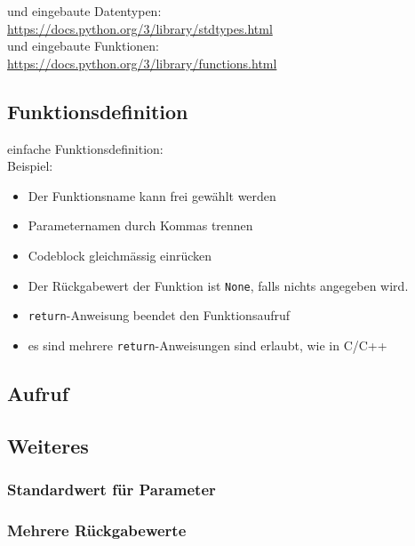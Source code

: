 und eingebaute Datentypen:\\
\url{https://docs.python.org/3/library/stdtypes.html}\\

und eingebaute Funktionen:\\
\url{https://docs.python.org/3/library/functions.html}

\subsection{Funktionsdefinition}
einfache Funktionsdefinition:\\


Beispiel:\\


\begin{itemize}
	\item Der Funktionsname kann frei gewählt werden
	\item Parameternamen durch Kommas trennen
	\item Codeblock gleichmässig einrücken
	\item Der Rückgabewert der Funktion ist \texttt{None}, falls nichts angegeben wird.
	\item \texttt{return}-Anweisung beendet den Funktionsaufruf
	\item es sind mehrere \texttt{return}-Anweisungen sind erlaubt, wie in C/C++
\end{itemize}



\subsection{Aufruf}


\subsection{Weiteres}

\subsubsection{Standardwert für Parameter}


\subsubsection{Mehrere Rückgabewerte}



